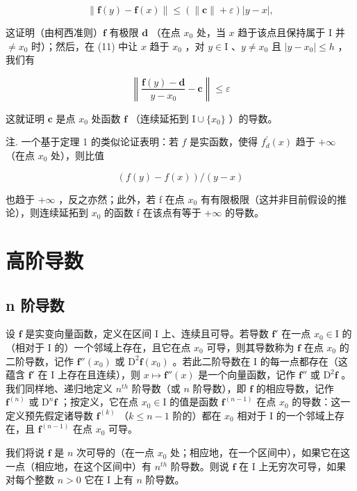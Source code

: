 \[
\left\| \mathbf {f} (y) - \mathbf {f} (x) \right\| \leqslant \left(\left\| \mathbf {c} \right\| + \varepsilon\right) | y - x |,
\]

这证明（由柯西准则）\(\mathbf{f}\) 有极限 \(\mathbf{d}\) （在点 \(x_0\) 处，当 \(x\) 趋于该点且保持属于 \(\mathrm{I}\) 并 \(\neq x_0\) 时）；然后，在 (11) 中让 \(x\) 趋于 \(x_0\) ，对 \(y \in \mathrm{I}\) 、\(y \neq x_0\) 且 \(|y - x_0| \leqslant h\) ，我们有

\[
\left\| \frac {\mathbf {f} (y) - \mathbf {d}}{y - x _ {0}} - \mathbf {c} \right\| \leqslant \varepsilon
\]

这就证明 \(\mathbf{c}\) 是点 \(x_0\) 处函数 \(\mathbf{f}\) （连续延拓到 \(\mathrm{I} \cup \{x_0\}\) ）的导数。

注. 一个基于定理 1 的类似论证表明：若 \(f\) 是实函数，使得 \(f_{d}^{\prime}(x)\) 趋于 \(+\infty\) （在点 \(x_0\) 处），则比值

\[
(f (y) - f (x)) / (y - x)
\]

也趋于 \(+\infty\) ，反之亦然；此外，若 f 在点 \(x_{0}\) 有有限极限（这并非目前假设的推论），则连续延拓到 \(x_{0}\) 的函数 f 在该点有等于 \(+\infty\) 的导数。

\section{高阶导数}

\subsection{n 阶导数}

设 \(\mathbf{f}\) 是实变向量函数，定义在区间 I 上、连续且可导。若导数 \(\mathbf{f}'\) 在一点 \(x_0 \in \mathrm{I}\) 的（相对于 I 的）一个邻域上存在，且它在点 \(x_0\) 可导，则其导数称为 \(\mathbf{f}\) 在点 \(x_0\) 的二阶导数，记作 \(\mathbf{f}''(x_0)\) 或 \(\mathrm{D}^2\mathbf{f}(x_0)\) 。若此二阶导数在 I 的每一点都存在（这蕴含 \(\mathbf{f}'\) 在 I 上存在且连续），则 \(x \mapsto \mathbf{f}''(x)\) 是一个向量函数，记作 \(\mathbf{f}''\) 或 \(\mathrm{D}^2\mathbf{f}\) 。我们同样地、递归地定义 \(n^{th}\) 阶导数（或 \(n\) 阶导数），即 \(\mathbf{f}\) 的相应导数，记作 \(\mathbf{f}^{(n)}\) 或 \(\mathrm{D}^n\mathbf{f}\) ；按定义，它在点 \(x_0 \in \mathrm{I}\) 的值是函数 \(\mathbf{f}^{(n-1)}\) 在点 \(x_0\) 的导数：这一定义预先假定诸导数 \(\mathbf{f}^{(k)}\) （\(k \leqslant n - 1\) 阶的）都在 \(x_0\) 相对于 I 的一个邻域上存在，且 \(\mathbf{f}^{(n-1)}\) 在点 \(x_0\) 可导。

我们将说 \(\mathbf{f}\) 是 \(n\) 次可导的（在一点 \(x_0\) 处；相应地，在一个区间中），如果它在这一点（相应地，在这个区间中）有 \(n^{th}\) 阶导数。则说 \(\mathbf{f}\) 在 I 上无穷次可导，如果对每个整数 \(n > 0\) 它在 I 上有 \(n\) 阶导数。

